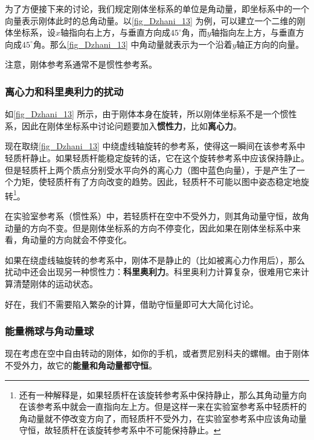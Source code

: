 为了方便接下来的讨论，我们规定刚体坐标系的单位是角动量，即坐标系中的一个向量表示刚体此时的总角动量。以\autoref{fig_Dzhani_13} 为例，可以建立一个二维的刚体坐标系，设$x$轴指向右上方，与垂直方向成$45^\circ$角，而$y$轴指向左上方，与垂直方向成$45^\circ$角。那么\autoref{fig_Dzhani_13} 中角动量就表示为一个沿着$y$轴正方向的向量。


注意，刚体参考系通常不是惯性参考系。




\subsubsection{离心力和科里奥利力的扰动}




如\autoref{fig_Dzhani_13} 所示，由于刚体本身在旋转，所以刚体坐标系不是一个惯性系，因此在刚体坐标系中讨论问题要加入\textbf{惯性力}，比如\textbf{离心力}。

现在取绕\autoref{fig_Dzhani_13} 中绕虚线轴旋转的参考系，使得这一瞬间在该参考系中轻质杆静止。如果轻质杆能稳定旋转的话，它在这个旋转参考系中应该保持静止。但是轻质杆上两个质点分别受水平向外的离心力（图中蓝色向量），于是产生了一个力矩，使轻质杆有了方向改变的趋势。因此，轻质杆不可能以图中姿态稳定地旋转\footnote{还有一种解释是，如果轻质杆在该旋转参考系中保持静止，那么其角动量方向在该参考系中就会一直指向左上方。但是这样一来在实验室参考系中轻质杆的角动量就不停改变方向了，而轻质杆不受外力，在实验室参考系中应该角动量守恒，故轻质杆在该旋转参考系中不可能保持静止。}。

在实验室参考系（惯性系）中，若轻质杆在空中不受外力，则其角动量守恒，故角动量的方向不变。但是刚体坐标系的方向不停变化，因此如果在刚体坐标系中来看，角动量的方向就会不停变化。


如果在绕虚线轴旋转的参考系中，刚体不是静止的（比如被离心力作用后），那么扰动中还会出现另一种惯性力：\textbf{科里奥利力}。科里奥利力计算复杂，很难用它来计算清楚刚体的运动状态。


好在，我们不需要陷入繁杂的计算，借助守恒量即可大大简化讨论。








\subsubsection{能量椭球与角动量球}






现在考虑在空中自由转动的刚体，如你的手机，或者贾尼别科夫的螺帽。由于刚体不受外力，故它的\textbf{能量和角动量都守恒}。


